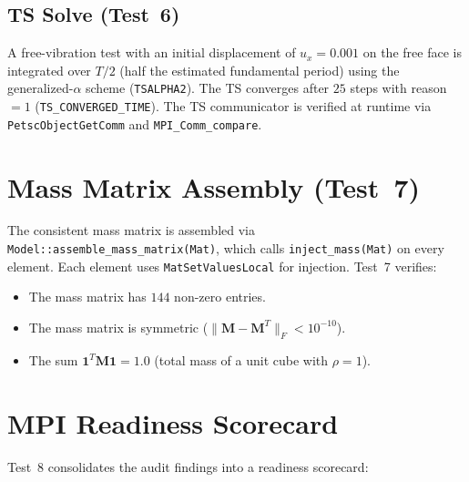 \subsection{TS Solve (Test~6)}

A free-vibration test with an initial displacement of
$u_x=0.001$ on the free face is integrated over $T/2$ (half
the estimated fundamental period) using the
generalized-$\alpha$ scheme (\texttt{TSALPHA2}).
The TS converges after $25$ steps with reason $=1$
(\texttt{TS\_CONVERGED\_TIME}).
The TS communicator is verified at runtime via
\texttt{PetscObjectGetComm} and \texttt{MPI\_Comm\_compare}.


\section{Mass Matrix Assembly (Test~7)}
\label{sec:phase6-mass}

The consistent mass matrix is assembled via
\texttt{Model::assemble\_mass\_matrix(Mat)}, which calls
\texttt{inject\_mass(Mat)} on every element.  Each element uses
\texttt{MatSetValuesLocal} for injection.  Test~7 verifies:
\begin{itemize}
  \item The mass matrix has $144$ non-zero entries.
  \item The mass matrix is symmetric ($\|\mathbf{M}-\mathbf{M}^T\|_F < 10^{-10}$).
  \item The sum $\mathbf{1}^T\mathbf{M}\mathbf{1} = 1.0$ (total mass of a
        unit cube with $\rho=1$).
\end{itemize}


\section{MPI Readiness Scorecard}
\label{sec:phase6-scorecard}

Test~8 consolidates the audit findings into a readiness scorecard:

